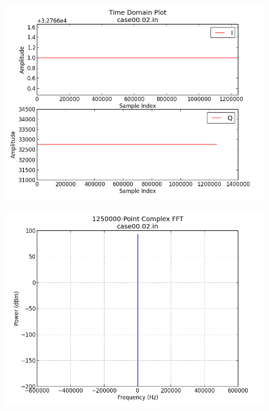 \documentclass{article}
\begin{document}
	\begin{figure}[ht]
		\centering
		\begin{minipage}{.5\textwidth}
			\centering\includegraphics[width=1.0\linewidth]{input_time_DC}
			\label{fig:input_time_DC}
		\end{minipage}%
		\begin{minipage}{.5\textwidth}
			\centering\includegraphics[width=1.0\linewidth]{input_freq_DC}
			\label{fig:input_freq_DC}
		\end{minipage}
	\end{figure}
\end{document}
